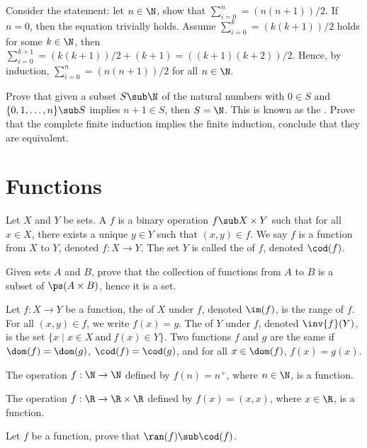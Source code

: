 \documentclass[10pt]{article}
\begin{document}
\begin{example}
    Consider the statement: let $n\in\N$, show that ${\sum}_{i=0}^{n}=(n(n+1))/2$. If $n=0$, then the equation trivially holds. Assume ${\sum}_{i=0}^{k}=(k(k+1))/2$ holds for some $k\in\N$, then ${\sum}_{i=0}^{k+1}=(k(k+1))/2+(k+1)=((k+1)(k+2))/2$. Hence, by induction, ${\sum}_{i=0}^{n}=(n(n+1))/2$ for all $n\in\N$.
\end{example}
\begin{problem}
    Prove that given a subset $S\sub\N$ of the natural numbers with $0\in S$ and $\{0,1,\dots,n\}\sub S$ implies $n+1\in S$, then $S=\N$. This is known as the . Prove that the complete finite induction implies the finite induction, conclude that they are equivalent.
\end{problem}
\section{Functions}
\begin{definition}
    Let $X$ and $Y$ be sets. A  $f$ is a binary operation $f\sub X\times Y$ such that for all $x\in X$, there exists a unique $y\in Y$ such that $(x,y)\in f$. We say $f$ is a function from $X$ to $Y$, denoted $f:X\to Y$. The set $Y$ is called the  of $f$, denoted $\cod(f)$.
\end{definition}
\begin{problem}
    Given sets $A$ and $B$, prove that the collection of functions from $A$ to $B$ is a subset of $\ps(A\times B)$, hence it is a set.
\end{problem}
\begin{definition}
    Let $f:X\to Y$ be a function, the  of $X$ under $f$, denoted $\im(f)$, is the range of $f$. For all $(x,y)\in f$, we write $f(x)=y$. The  of $Y$ under $f$, denoted $\inv{f}(Y)$, is the set $\{x\mid x\in X\ \text{and}\ f(x)\in Y\}$. Two functions $f$ and $g$ are the same if $\dom(f)=\dom(g)$, $\cod(f)=\cod(g)$, and for all $x\in\dom(f)$, $f(x)=g(x)$.
\end{definition}
\begin{example}
    The operation $f:\N\to\N$ defined by $f(n)={n}^{+}$, where $n\in\N$, is a function.
\end{example}
\begin{example}
    The operation $f:\R\to\R\times\R$ defined by $f(x)=(x,x)$, where $x\in\R$, is a function.
\end{example}
\begin{problem}
    Let $f$ be a function, prove that $\ran(f)\sub\cod(f)$.
\end{problem}
\end{document}
